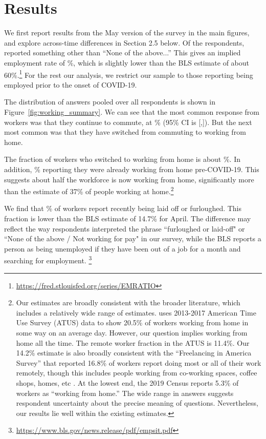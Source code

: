\documentclass[12pt]{article}
\begin{document}
\section{Results}
We first report results from the May version of the survey in the main figures, and explore across-time differences in Section 2.5 below. Of the respondents, \numObsWorking{} reported something other than ``None of the above...''
This gives an implied employment rate of \LFPRhat{}\%, which is slightly lower than the BLS estimate of about 60\%.\footnote{
  \url{https://fred.stlouisfed.org/series/EMRATIO}
}
For the rest our analysis, we restrict our sample to those reporting being employed prior to the onset of COVID-19.

The distribution of answers pooled over all respondents is shown in Figure~\ref{fig:working_summary}. 
We can see that the most common response from workers was that they continue to commute, at \stillCommute{}\% (95\% CI is [\stillCommuteLB,\stillCommuteUB]). 
But the next most common was that they have switched from commuting to working from home. 

The fraction of workers who switched to working from home is about \WFH{}\%.  In addition,  \alreadyWFH{}\% reporting they were already working from home pre-COVID-19.  This suggests about half the workforce is now working from home, significantly more than the \cite{dingel2020} estimate of 37\% of people working at home.\footnote{
Our estimates are broadly consistent with the broader literature, which includes a relatively wide range of estimates.
\cite{krantz2019did} uses 2013-2017 American Time Use Survey (ATUS) data to show 20.5\% of workers working from home in some way on an average day.
However, our question implies working from home all the time.
The remote worker fraction in the ATUS is 11.4\%.
Our 14.2\% estimate is also broadly consistent with the ``Freelancing in America Survey'' that reported 16.8\% of workers report doing most or all of their work remotely, though this includes people working from co-working spaces, coffee shops, homes, etc \citep{ozimek2020}.
At the lowest end, the 2019 Census reports 5.3\% of workers as ``working from home.''
The wide range in answers suggests respondent uncertainty about the precise meaning of questions. Nevertheless, our results lie well within the existing estimates.
}

We find that \LaidOff{}\% of workers report recently being laid off or furloughed. This fraction is lower than the BLS estimate of 14.7\% for April. The difference may reflect the way respondents interpreted the phrase ``furloughed or laid-off" or ``None of the above / Not working for pay" in our survey, while the BLS reports a person as being unemployed if they have been out of a job for a month and searching for employment. \footnote{
  \url{https://www.bls.gov/news.release/pdf/empsit.pdf}
}
\end{document}
